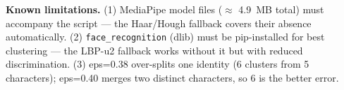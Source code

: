 \documentclass[11pt,a4paper,titlepage]{article}
\begin{document}
\textbf{Known limitations.}
(1) MediaPipe model files ($\approx$ 4.9~MB total) must accompany the script
--- the Haar/Hough fallback covers their absence automatically.
(2) \texttt{face\_recognition} (dlib) must be pip-installed for best clustering
--- the LBP-u2 fallback works without it but with reduced discrimination.
(3) eps=0.38 over-splits one identity (6 clusters from 5 characters); eps=0.40
merges two distinct characters, so 6 is the better error.

\renewcommand{\bibsection}{\section*{References}}

{\small}
\end{document}
